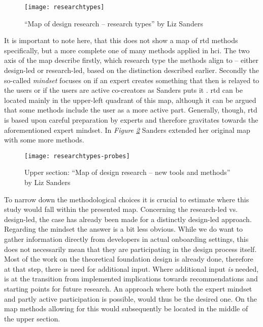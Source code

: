 \begin{figure}[h]
  \centering
  \texttt{[image: researchtypes]}
  \caption{\enquote{Map of design research -- research types} by Liz Sanders \cite[p. 3]{sanders2008evolving}}
  \label{fig:researchtypes}
\end{figure}

It is important to note here, that this does not show a map of \gls{rtd} methods specifically, but a more complete one of many methods applied in \gls{hci}. The two axis of the map describe firstly, which research type the methods align to -- either design-led or research-led, based on the distinction described earlier. Secondly the so-called \textit{mindset} focuses on if an expert creates something that then is relayed to the users or if the users are active co-creators as Sanders puts it \cite[p. 5-6]{sanders2008evolving}. \gls{rtd} can be located mainly in the upper-left quadrant of this map, although it can be argued that some methods include the user as a more active part. Generally, though, \gls{rtd} is based upon careful preparation by experts and therefore gravitates towards the aforementioned expert mindset. In \textit{Figure \ref{fig:researchtypes-probes}} Sanders extended her original map with some more methods.

\begin{figure}[h]
  \centering
  \texttt{[image: researchtypes-probes]}
  \caption{Upper section: \enquote{Map of design research -- new tools and methods} by Liz Sanders \cite[p. 6]{sanders2008evolving}}
  \label{fig:researchtypes-probes}
\end{figure}

To narrow down the methodological choices it is crucial to estimate where this study would fall within the presented map. Concerning the research-led vs. design-led, the case has already been made for a distinctly design-led approach. Regarding the mindset the answer is a bit less obvious. While we do want to gather information directly from developers in actual onboarding settings, this does not necessarily mean that they are participating in the design process itself. Most of the work on the theoretical foundation design is already done, therefore at that step, there is need for additional input. Where additional input \textit{is} needed, is at the transition from implemented implications towards recommendations and starting points for future research. An approach where both the expert mindset and partly active participation is possible, would thus be the desired one. On the map methods allowing for this would subsequently be located in the middle of the upper section.

